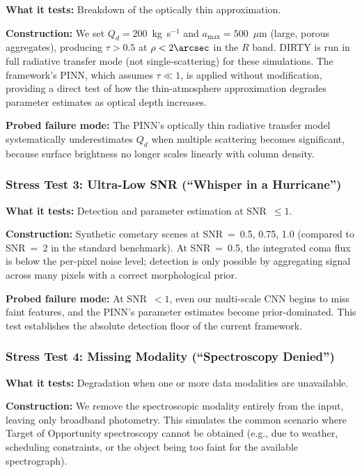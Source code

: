 \documentclass[usenatbib]{mnras}
\begin{document}
\textbf{What it tests:} Breakdown of the optically thin approximation.

\textbf{Construction:} We set $Q_d = 200$~kg~s$^{-1}$ and $a_{\max} = 500$~$\mu$m (large, porous aggregates), producing $\tau > 0.5$ at $\rho < 2\arcsec$ in the $R$ band. DIRTY is run in full radiative transfer mode (not single-scattering) for these simulations. The framework's PINN, which assumes $\tau \ll 1$, is applied without modification, providing a direct test of how the thin-atmosphere approximation degrades parameter estimates as optical depth increases.

\textbf{Probed failure mode:} The PINN's optically thin radiative transfer model systematically underestimates $Q_d$ when multiple scattering becomes significant, because surface brightness no longer scales linearly with column density.

\subsubsection{Stress Test 3: Ultra-Low SNR (``Whisper in a Hurricane'')}

\textbf{What it tests:} Detection and parameter estimation at SNR~$\leq 1$.

\textbf{Construction:} Synthetic cometary scenes at SNR~=~0.5, 0.75, 1.0 (compared to SNR~=~2 in the standard benchmark). At SNR~=~0.5, the integrated coma flux is below the per-pixel noise level; detection is only possible by aggregating signal across many pixels with a correct morphological prior.

\textbf{Probed failure mode:} At SNR~$<1$, even our multi-scale CNN begins to miss faint features, and the PINN's parameter estimates become prior-dominated. This test establishes the absolute detection floor of the current framework.

\subsubsection{Stress Test 4: Missing Modality (``Spectroscopy Denied'')}

\textbf{What it tests:} Degradation when one or more data modalities are unavailable.

\textbf{Construction:} We remove the spectroscopic modality entirely from the input, leaving only broadband photometry. This simulates the common scenario where Target of Opportunity spectroscopy cannot be obtained (e.g., due to weather, scheduling constraints, or the object being too faint for the available spectrograph).
\end{document}

